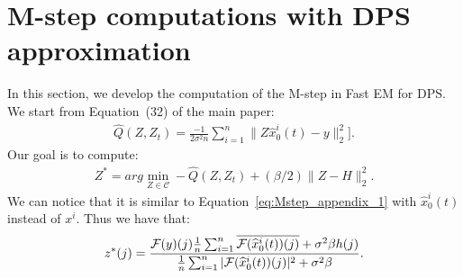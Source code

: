 \section{M-step computations with DPS approximation}\label{sec:Mstep-dps}

In this section, we develop the computation of the M-step in Fast EM for DPS. We start from Equation~(32) of the main paper:
\begin{align}\label{eq:proxQ-dps}
    \widehat{Q}(Z, Z_t) = \frac{-1}{2\sigma^2 n}\sum_{i=1}^n{\|Z\widehat{x}_0^i(t)-y\|_2^2]}.
\end{align}
Our goal is to compute:
\begin{align}
    Z^* = arg\min_{Z\in \mathcal{C}} -\widehat{Q}(Z, Z_t) + (\beta/2)\|Z-H\|_2^2.
\end{align}
We can notice that it is similar to Equation~\eqref{eq:Mstep_appendix_1} with $\widehat{x}_0^i(t)$ instead of $x^i$. Thus we have that:
\begin{equation}
    z^*(j) = \frac{{\mathcal{F}(y)}(j)\frac{1}{n}\sum_{i=1}^n{\overline{\mathcal{F}(\widehat{x}_0^i(t))(j)}} + \sigma^2 \beta h(j)}{\frac{1}{n}\sum_{i=1}^n{|\mathcal{F}(\widehat{x}_0^i(t))(j)|^2} + \sigma^2 \beta}.
\end{equation}


